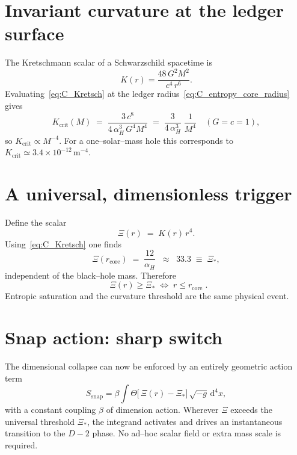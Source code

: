 \documentclass[a4paper, 12pt, oneside]{book}
\numberwithin{equation}{chapter}
\begin{document}
\section{Invariant curvature at the ledger surface}
\label{sec:C_Kretschmann}
The Kretschmann scalar of a Schwarzschild spacetime is
\begin{equation}
  K(r) = \frac{48\,G^{2}M^{2}}{c^{4}\,r^{6}} .
  \label{eq:C_Kretsch}
\end{equation}
Evaluating~\eqref{eq:C_Kretsch} at the ledger radius~\eqref{eq:C_entropy_core_radius} gives
\begin{equation}
  K_{\mathrm{crit}}(M)
  \;=\;
  \frac{3\,c^{8}}{4\,\alpha_H^{3}\,G^{4}M^{4}}
  \;=\;
  \frac{3}{4\,\alpha_H^{3}}\;\frac{1}{M^{4}}
  \quad (G=c=1),
  \label{eq:C_K_crit}
\end{equation}
so $K_{\mathrm{crit}}\propto M^{-4}$.  For a one--solar--mass hole this corresponds to $K_{\mathrm{crit}}\simeq3.4\times10^{-12}\,\text{m}^{-4}$.

\section{A universal, dimensionless trigger}
\label{sec:C_dimensionless_trigger}
Define the scalar
\begin{equation}
  \Xi(r) \;=\; K(r)\,r^{4} .
  \label{eq:C_Xi_def}
\end{equation}
Using~\eqref{eq:C_Kretsch} one finds
\begin{equation}
  \Xi(r_{\mathrm{core}})\;=\;\frac{12}{\alpha_H}\;\;\approx\;\;33.3 \;\equiv\; \Xi_{*},
  \label{eq:C_Xi_star}
\end{equation}
independent of the black--hole mass.  Therefore
\begin{equation}
  \boxed{\;\;\Xi(r)\ge\Xi_{*}\;\Longleftrightarrow\;r\le r_{\mathrm{core}}\;} .
  \label{eq:C_equivalence}
\end{equation}
Entropic saturation and the curvature threshold are the same physical event.

\section{Snap action: sharp switch}\label{sec:C_snap_action}
The dimensional collapse can now be enforced by an entirely geometric action term
\begin{equation}
  S_{\mathrm{snap}} = \beta\!\int\! \Theta\!\bigl[\,\Xi(r)-\Xi_{*}\bigr]\,\sqrt{-g}\,\mathrm{d}^{4}x ,
  \label{eq:C_snap_action}
\end{equation}
with a constant coupling $\beta$ of dimension action.  Wherever $\Xi$ exceeds the universal threshold $\Xi_{*}$, the integrand activates and drives an instantaneous transition to the $D-2$ phase.  No ad--hoc scalar field or extra mass scale is required.
\end{document}
